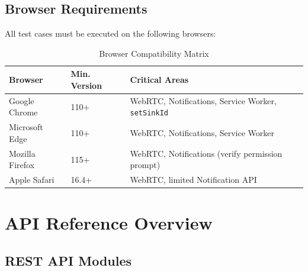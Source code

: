 \documentclass[11pt,a4paper]{report}
\begin{document}
\section{Browser Requirements}
All test cases must be executed on the following browsers:

\begin{xltabular}{\textwidth}{|L{3.5cm}|C{2.5cm}|X|}
\caption{Browser Compatibility Matrix} \\
\hline
{} \textbf{Browser} & \textbf{Min. Version} & \textbf{Critical Areas} \\ \hline
\endhead
Google Chrome   & 110+ & WebRTC, Notifications, Service Worker, \texttt{setSinkId} \\ \hline
Microsoft Edge  & 110+ & WebRTC, Notifications, Service Worker \\ \hline
Mozilla Firefox & 115+ & WebRTC, Notifications (verify permission prompt) \\ \hline
Apple Safari    & 16.4+& WebRTC, limited Notification API \\ \hline
\end{xltabular}

\chapter{API Reference Overview}

\section{REST API Modules}
\end{document}
